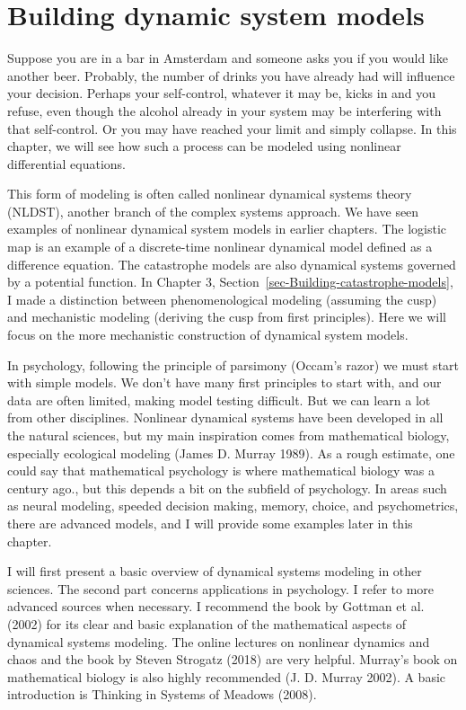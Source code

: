 \documentclass[
  a4paper,
  DIV=11,
  numbers=noendperiod,
  oneside]{scrreprt}
\begin{document}

\hypertarget{sec-ch4n}{%
\chapter{Building dynamic system models}\label{sec-ch4n}}

Suppose you are in a bar in Amsterdam and someone asks you if you would
like another beer. Probably, the number of drinks you have already had
will influence your decision. Perhaps your self-control, whatever it may
be, kicks in and you refuse, even though the alcohol already in your
system may be interfering with that self-control. Or you may have
reached your limit and simply collapse. In this chapter, we will see how
such a process can be modeled using nonlinear differential equations.

This form of modeling is often called nonlinear dynamical systems theory
(NLDST), another branch of the complex systems approach. We have seen
examples of nonlinear dynamical system models in earlier chapters. The
logistic map is an example of a discrete-time nonlinear dynamical model
defined as a difference equation. The catastrophe models are also
dynamical systems governed by a potential function. In Chapter 3,
Section~\ref{sec-Building-catastrophe-models}, I made a distinction
between phenomenological modeling (assuming the cusp) and mechanistic
modeling (deriving the cusp from first principles). Here we will focus
on the more mechanistic construction of dynamical system models.

In psychology, following the principle of parsimony (Occam's razor) we
must start with simple models. We don't have many first principles to
start with, and our data are often limited, making model testing
difficult. But we can learn a lot from other disciplines. Nonlinear
dynamical systems have been developed in all the natural sciences, but
my main inspiration comes from mathematical biology, especially
ecological modeling (James D. Murray 1989). As a rough estimate, one
could say that mathematical psychology is where mathematical biology was
a century ago., but this depends a bit on the subfield of psychology. In
areas such as neural modeling, speeded decision making, memory, choice,
and psychometrics, there are advanced models, and I will provide some
examples later in this chapter.

I will first present a basic overview of dynamical systems modeling in
other sciences. The second part concerns applications in psychology. I
refer to more advanced sources when necessary. I recommend the book by
Gottman et al. (2002) for its clear and basic explanation of the
mathematical aspects of dynamical systems modeling. The online lectures
on nonlinear dynamics and chaos and the book by Steven Strogatz (2018)
are very helpful. Murray's book on mathematical biology is also highly
recommended (J. D. Murray 2002). A basic introduction is Thinking in
Systems of Meadows (2008).
\end{document}
